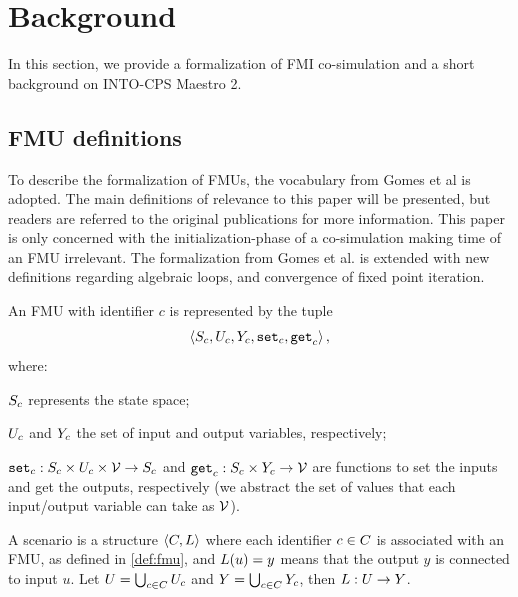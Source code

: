 
\section{Background}\label{sc:background}
In this section, we provide a formalization of FMI co-simulation and a short background on INTO-CPS Maestro 2.

\subsection{FMU definitions}
To describe the formalization of FMUs, the vocabulary from Gomes et al\cite{gomes_lucio_vangheluwe_2019, Gomes2018} is adopted. The main definitions of relevance to this paper will be presented, but readers are referred to the original publications for more information. This paper is only concerned with the initialization-phase of a co-simulation making time of an FMU irrelevant. The formalization from Gomes et al. is extended with new definitions regarding algebraic loops, and convergence of fixed point iteration.
\begin{definition}[FMU]\label{def:fmu}
  An FMU with identifier $c$ is represented by the tuple   
  $$ \left\langle S_{c}, U_{c}, Y_{c}, \mathtt{set}_{c}, \mathtt{get}_{c} \right\rangle ,$$
  where:
  \begin{inparadesc}
    \item $S_{c}$ represents the state space;
    \item $U_{c}$ and $Y_{c}$ the set of input and output variables, respectively;
    \item $\mathtt{set}_{c} : S_{c} \times U_{c} \times \mathcal{V} \to S_{c}$ and $\mathtt{get}_{c}: S_{c} \times Y_{c} \to \mathcal{V}$ are functions to set the inputs and get the outputs, respectively (we abstract the set of values that each input/output variable can take as $\mathcal{V}$).
  \end{inparadesc}
\end{definition}

\begin{definition}[Scenario]\label{def:cosim_scenario}
  A scenario is a structure $ \left\langle C, L \right\rangle $ where each identifier $c \in C$ is associated with an FMU, as defined in \ref{def:fmu}, and $L(u)=y$ means that the output $y$ is connected to input $u$.
  Let $U = \bigcup_{c \in C} U_{c}$ and $Y = \bigcup_{c \in C} Y_{c}$, then $L : U \to Y$.
\end{definition}

